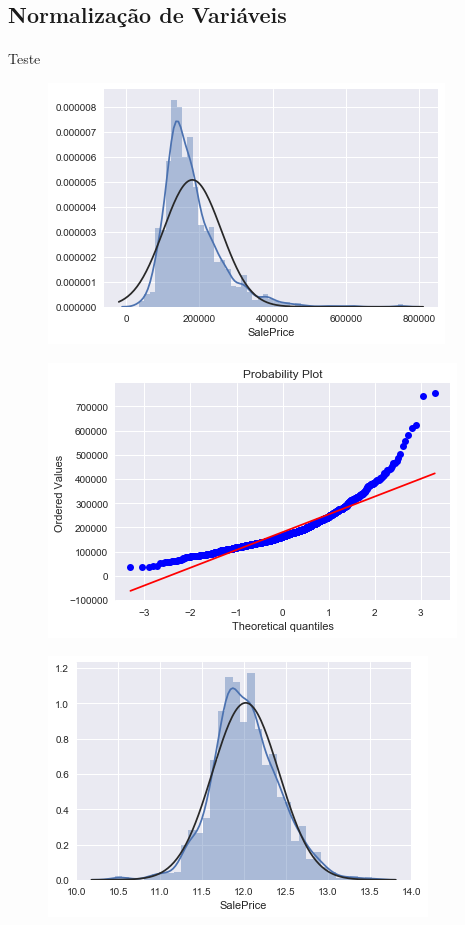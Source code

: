 \documentclass{article}
\begin{document}
		\subsection{Normalização de Variáveis}
			\paragraph{}Teste
			
			\begin{figure}[H]
				\centering
				\includegraphics[scale=0.8]{../img/saleprice_norm_1}
				\caption{}
			\end{figure}

			\begin{figure}[H]
				\centering
				\includegraphics[scale=0.8]{../img/saleprice_norm_2}
				\caption{}
			\end{figure}
			
			\begin{figure}[H]
				\centering
				\includegraphics[scale=0.8]{../img/saleprice_norm_after_1}
				\caption{}
			\end{figure}
			
\end{document}
